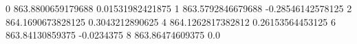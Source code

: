 0 863.8800659179688 0.01531982421875
1 863.5792846679688 -0.28546142578125
2 864.1690673828125 0.3043212890625
4 864.1262817382812 0.26153564453125
6 863.84130859375 -0.0234375
8 863.86474609375 0.0
